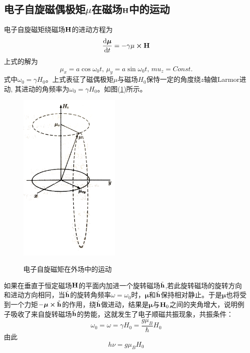 \documentclass[a4paper]{article}
\begin{document}
\subsection{电子自旋磁偶极矩$\mu$在磁场$ \vb{H} $中的运动}
电子自旋磁矩绕磁场$ \vb{H} $的进动方程为
\begin{equation}
\dv{\bm\mu}{t} = -\gamma\mu\cross \vb{H}          \label{eq6}
\end{equation}
上式的解为
\begin{equation}
\mu_x = a\cos\omega_0 t  \text{, }  \mu_y = a\sin\omega_0 t  \text{, }
mu_z = Const.    \label{eq38}
\end{equation}
式中$\omega_0 = \gamma H_0$。上式表征了磁偶极矩$\mu$与磁场$H_0$保恃一定的角度绕$ z $轴做Larmor进动, 其进动的角频率为$\omega_0 = \gamma H_0$。如图(\ref{fig2})所示。
\begin{figure}[H]
\centering
\includegraphics[width=5cm]{fig/fig2.jpg}\\
\caption{电子自旋磁矩在外场中的运动}\label{fig2}
\end{figure}
如果在垂直于恒定磁场$ \vb{H} $的平面内加进一个旋转磁场$\tilde{\vb{h}}$,若此旋转磁场的旋转方向和进动方向相冋，当$\tilde{\vb{h}}$的旋转角频率$\omega = \omega_0$时，$\bm\mu$和$\tilde{\vb{h}}$保持相对静止。于是$\bm\mu$也将受到一个力矩$ -\bm\mu\cross\tilde{\vb{h}} $的作用，绕$\tilde{\vb{h}}$做进动，结果是$\bm\mu$与$\vb{H}_0$之间的夹角增大，说明例子吸收了来自旋转磁场$\tilde{\vb{h}}$的势能，这就发生了电子顺磁共振现象，共振条件：
\begin{equation}
\omega_0 = \omega = \gamma H_0 = \dfrac{g\mu_B}{\hbar}H_0\label{eq9}
\end{equation}
由此
\begin{equation}
h\nu = g\mu_BH_0             \label{eq10}
\end{equation}
\end{document}
